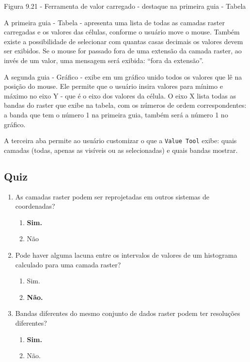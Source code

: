 \documentclass[
]{krantz}
\providecommand{\tightlist}{%
  \setlength{\itemsep}{0pt}\setlength{\parskip}{0pt}}
\begin{document}
Figura 9.21 - Ferramenta de valor carregado - destaque na primeira guia - Tabela

A primeira guia - Tabela - apresenta uma lista de todas as camadas raster carregadas e os valores das células, conforme o usuário move o mouse. Também existe a possibilidade de selecionar com quantas casas decimais os valores devem ser exibidos. Se o mouse for passado fora de uma extensão da camada raster, ao invés de um valor, uma mensagem será exibida: ``fora da extensão''.

A segunda guia - Gráfico - exibe em um gráfico unido todos os valores que lê na posição do mouse. Ele permite que o usuário insira valores para mínimo e máximo no eixo Y - que é o eixo dos valores da célula. O eixo X lista todas as bandas do raster que exibe na tabela, com os números de ordem correspondentes: a banda que tem o número 1 na primeira guia, também será a número 1 no gráfico.

A terceira aba permite ao usuário customizar o que a \texttt{Value\ Tool} exibe: quais camadas (todas, apenas as visíveis ou as selecionadas) e quais bandas mostrar.

\hypertarget{quiz-21}{%
\subsection{Quiz}\label{quiz-21}}

\begin{enumerate}
\def\labelenumi{\arabic{enumi}.}
\tightlist
\item
  As camadas raster podem ser reprojetadas em outros sistemas de coordenadas?

  \begin{enumerate}
  \def\labelenumii{\alph{enumii}.}
  \tightlist
  \item
    \textbf{Sim.}
  \item
    Não
  \end{enumerate}
\item
  Pode haver alguma lacuna entre os intervalos de valores de um histograma calculado para uma camada raster?

  \begin{enumerate}
  \def\labelenumii{\alph{enumii}.}
  \tightlist
  \item
    Sim.
  \item
    \textbf{Não.}
  \end{enumerate}
\item
  Bandas diferentes do mesmo conjunto de dados raster podem ter resoluções diferentes?

  \begin{enumerate}
  \def\labelenumii{\alph{enumii}.}
  \tightlist
  \item
    \textbf{Sim.}
  \item
    Não.
  \end{enumerate}
\end{enumerate}
\end{document}
